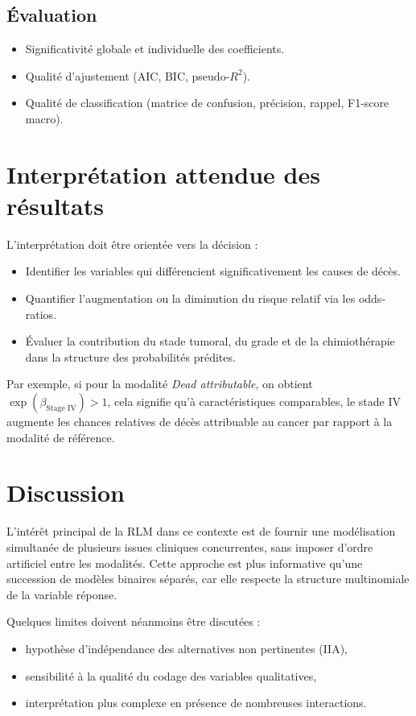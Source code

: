 \documentclass[12pt,a4paper]{article}
\begin{document}
\begin{itemize}
\subsection{Évaluation}
\begin{itemize}
    \item Significativité globale et individuelle des coefficients.
    \item Qualité d'ajustement (AIC, BIC, pseudo-$R^2$).
    \item Qualité de classification (matrice de confusion, précision, rappel, F1-score macro).
\end{itemize}

\section{Interprétation attendue des résultats}
L'interprétation doit être orientée vers la décision :
\begin{itemize}
    \item Identifier les variables qui différencient significativement les causes de décès.
    \item Quantifier l'augmentation ou la diminution du risque relatif via les odds-ratios.
    \item Évaluer la contribution du stade tumoral, du grade et de la chimiothérapie dans la structure des probabilités prédites.
\end{itemize}

Par exemple, si pour la modalité \textit{Dead attributable}, on obtient $\exp(\beta_{\text{Stage IV}})>1$, cela signifie qu'à caractéristiques comparables, le stade IV augmente les chances relatives de décès attribuable au cancer par rapport à la modalité de référence.

\section{Discussion}
L'intérêt principal de la RLM dans ce contexte est de fournir une modélisation simultanée de plusieurs issues cliniques concurrentes, sans imposer d'ordre artificiel entre les modalités. Cette approche est plus informative qu'une succession de modèles binaires séparés, car elle respecte la structure multinomiale de la variable réponse.

Quelques limites doivent néanmoins être discutées :
\begin{itemize}
    \item hypothèse d'indépendance des alternatives non pertinentes (IIA),
    \item sensibilité à la qualité du codage des variables qualitatives,
    \item interprétation plus complexe en présence de nombreuses interactions.
\end{itemize}


\end{itemize}
\end{document}
